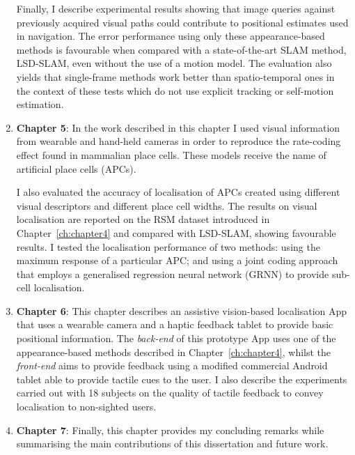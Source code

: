 \begin{enumerate}
Finally, I describe experimental results showing that image queries against previously acquired visual paths could contribute to positional estimates used in navigation. The error performance using only these appearance-based methods is favourable when compared with a state-of-the-art SLAM method, LSD-SLAM, even without the use of a motion model. The evaluation also yields that single-frame methods work better than spatio-temporal ones in the context of these tests which do not use explicit tracking or self-motion estimation. 

\item \textbf{Chapter 5}: In the work described in this chapter I used visual information from wearable and hand-held cameras in order to reproduce the rate-coding effect found in mammalian place cells. These models receive the name of artificial place cells (APCs). 

I also evaluated the accuracy of localisation of APCs created using different visual descriptors and different place cell widths. The results on visual localisation are reported on the RSM dataset introduced in Chapter~\ref{ch:chapter4} and compared with LSD-SLAM, showing favourable results. I tested the localisation performance of two methods: using the maximum response of a particular APC; and using a joint coding approach that employs a generalised regression neural network (GRNN) to provide sub-cell localisation.

\item \textbf{Chapter 6}: This chapter describes an assistive vision-based localisation App that uses a wearable camera and a haptic feedback tablet to provide basic positional information. The \textit{back-end} of this prototype App uses one of the appearance-based methods described in Chapter~\ref{ch:chapter4}, whilst the \textit{front-end} aims to provide feedback using a modified commercial Android tablet able to provide tactile cues to the user. I also describe the experiments carried out with 18 subjects on the quality of tactile feedback to convey localisation to non-sighted users.

\item \textbf{Chapter 7}: Finally, this chapter provides my concluding remarks while summarising the main contributions of this dissertation and future work.

\end{enumerate}